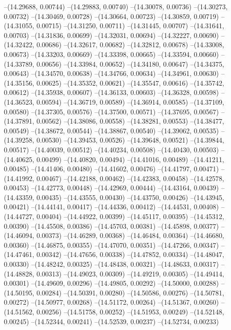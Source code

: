 --(14.29688, 0.00744)
--(14.29883, 0.00740)
--(14.30078, 0.00736)
--(14.30273, 0.00732)
--(14.30469, 0.00728)
--(14.30664, 0.00723)
--(14.30859, 0.00719)
--(14.31055, 0.00715)
--(14.31250, 0.00711)
--(14.31445, 0.00707)
--(14.31641, 0.00703)
--(14.31836, 0.00699)
--(14.32031, 0.00694)
--(14.32227, 0.00690)
--(14.32422, 0.00686)
--(14.32617, 0.00682)
--(14.32812, 0.00678)
--(14.33008, 0.00673)
--(14.33203, 0.00669)
--(14.33398, 0.00665)
--(14.33594, 0.00660)
--(14.33789, 0.00656)
--(14.33984, 0.00652)
--(14.34180, 0.00647)
--(14.34375, 0.00643)
--(14.34570, 0.00638)
--(14.34766, 0.00634)
--(14.34961, 0.00630)
--(14.35156, 0.00625)
--(14.35352, 0.00621)
--(14.35547, 0.00616)
--(14.35742, 0.00612)
--(14.35938, 0.00607)
--(14.36133, 0.00603)
--(14.36328, 0.00598)
--(14.36523, 0.00594)
--(14.36719, 0.00589)
--(14.36914, 0.00585)
--(14.37109, 0.00580)
--(14.37305, 0.00576)
--(14.37500, 0.00571)
--(14.37695, 0.00567)
--(14.37891, 0.00562)
--(14.38086, 0.00558)
--(14.38281, 0.00553)
--(14.38477, 0.00549)
--(14.38672, 0.00544)
--(14.38867, 0.00540)
--(14.39062, 0.00535)
--(14.39258, 0.00530)
--(14.39453, 0.00526)
--(14.39648, 0.00521)
--(14.39844, 0.00517)
--(14.40039, 0.00512)
--(14.40234, 0.00508)
--(14.40430, 0.00503)
--(14.40625, 0.00499)
--(14.40820, 0.00494)
--(14.41016, 0.00489)
--(14.41211, 0.00485)
--(14.41406, 0.00480)
--(14.41602, 0.00476)
--(14.41797, 0.00471)
--(14.41992, 0.00467)
--(14.42188, 0.00462)
--(14.42383, 0.00458)
--(14.42578, 0.00453)
--(14.42773, 0.00448)
--(14.42969, 0.00444)
--(14.43164, 0.00439)
--(14.43359, 0.00435)
--(14.43555, 0.00430)
--(14.43750, 0.00426)
--(14.43945, 0.00421)
--(14.44141, 0.00417)
--(14.44336, 0.00412)
--(14.44531, 0.00408)
--(14.44727, 0.00404)
--(14.44922, 0.00399)
--(14.45117, 0.00395)
--(14.45312, 0.00390)
--(14.45508, 0.00386)
--(14.45703, 0.00381)
--(14.45898, 0.00377)
--(14.46094, 0.00373)
--(14.46289, 0.00368)
--(14.46484, 0.00364)
--(14.46680, 0.00360)
--(14.46875, 0.00355)
--(14.47070, 0.00351)
--(14.47266, 0.00347)
--(14.47461, 0.00342)
--(14.47656, 0.00338)
--(14.47852, 0.00334)
--(14.48047, 0.00330)
--(14.48242, 0.00325)
--(14.48438, 0.00321)
--(14.48633, 0.00317)
--(14.48828, 0.00313)
--(14.49023, 0.00309)
--(14.49219, 0.00305)
--(14.49414, 0.00301)
--(14.49609, 0.00296)
--(14.49805, 0.00292)
--(14.50000, 0.00288)
--(14.50195, 0.00284)
--(14.50391, 0.00280)
--(14.50586, 0.00276)
--(14.50781, 0.00272)
--(14.50977, 0.00268)
--(14.51172, 0.00264)
--(14.51367, 0.00260)
--(14.51562, 0.00256)
--(14.51758, 0.00252)
--(14.51953, 0.00249)
--(14.52148, 0.00245)
--(14.52344, 0.00241)
--(14.52539, 0.00237)
--(14.52734, 0.00233)

